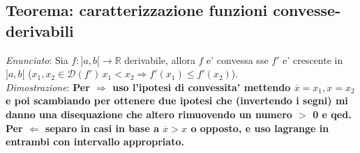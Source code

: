 \documentclass{article}
\begin{document}
\subsection{Teorema: caratterizzazione funzioni convesse-derivabili}

\emph{Enunciato}: Sia $f: ]a,b[ \to \mathbb{R}$ derivabile, allora $f$ e' convessa sse $f'$ e'
crescente in $]a,b[$ ($x_1, x_2 \in \mathcal{D}(f') \, x_1 < x_2 \Rightarrow f'(x_1) \leq f'(x_2)$). \\

\noindent\emph{Dimostrazione}: \textbf{Per $\Rightarrow$ uso l'ipotesi di convessita'
mettendo $\overline{x} = x_1, x = x_2$ e poi scambiando per ottenere due ipotesi che
(invertendo i segni) mi danno una disequazione che altero rimuovendo un numero $>$ 0 e qed. \\
Per $\Leftarrow$ separo in casi in base a $\overline{x} > x$ o opposto, e uso lagrange
in entrambi con intervallo appropriato.
}
\end{document}
